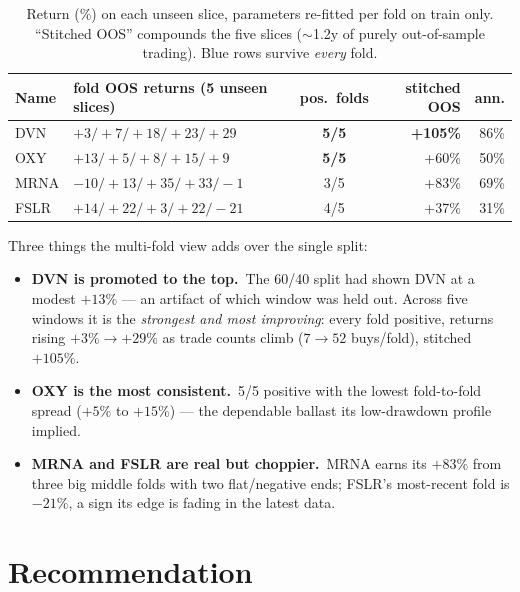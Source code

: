 \documentclass[11pt]{article}
\newcommand{\kpi}[2]{\textbf{#1}\,{\footnotesize\color{bcgrey}#2}}
\begin{document}
\begin{table}[H]\centering\small
\renewcommand{\arraystretch}{1.2}
\begin{tabular}{l l c r r}
\toprule
\textbf{Name} & \textbf{fold OOS returns (5 unseen slices)} & \textbf{pos.\ folds} & \textbf{stitched OOS} & \textbf{ann.}\\
\midrule
\rowcolor{bckeep} DVN  & $+3 / +7 / +18 / +23 / +29$   & \textbf{5/5} & \textbf{+105\%} & 86\%\\
\rowcolor{bckeep} OXY  & $+13 / +5 / +8 / +15 / +9$    & \textbf{5/5} & +60\%  & 50\%\\
MRNA & $-10 / +13 / +35 / +33 / -1$  & 3/5 & +83\%  & 69\%\\
FSLR & $+14 / +22 / +3 / +22 / -21$  & 4/5 & +37\%  & 31\%\\
\bottomrule
\end{tabular}
\caption*{\footnotesize Return (\%) on each unseen slice, parameters re-fitted per fold on
train only. ``Stitched OOS'' compounds the five slices ($\sim$1.2y of purely out-of-sample
trading). Blue rows survive \emph{every} fold.}
\end{table}

Three things the multi-fold view adds over the single split:
\begin{itemize}[leftmargin=1.4em,itemsep=2pt]
  \item \kpi{DVN is promoted to the top.}{} The 60/40 split had shown DVN at a modest $+13\%$
        --- an artifact of which window was held out. Across five windows it is the
        \emph{strongest and most improving}: every fold positive, returns rising $+3\%\to+29\%$
        as trade counts climb ($7\to52$ buys/fold), stitched $+105\%$.
  \item \kpi{OXY is the most consistent.}{} 5/5 positive with the lowest fold-to-fold spread
        ($+5\%$ to $+15\%$) --- the dependable ballast its low-drawdown profile implied.
  \item \kpi{MRNA and FSLR are real but choppier.}{} MRNA earns its $+83\%$ from three big
        middle folds with two flat/negative ends; FSLR's most-recent fold is $-21\%$, a sign its
        edge is fading in the latest data.
\end{itemize}

\section{Recommendation}
\end{document}
